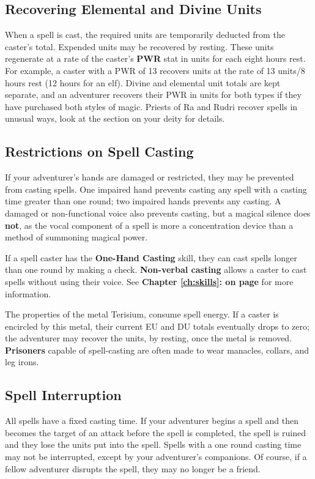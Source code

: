 \begin{multicols*}{2}
\subsection{Recovering Elemental and Divine Units}
When a spell is cast, the required units are temporarily deducted from the caster's total. Expended units may be recovered by resting. These units regenerate at a rate
of the caster's \textbf{PWR} stat in units for each eight hours rest. For example, a caster with a PWR of 13 recovers units at the rate of 13 units/8 hours rest (12 hours for an elf). Divine and elemental unit totals are kept separate, and an adventurer recovers their PWR in units for both types if they have purchased both styles of magic. Priests of Ra and Rudri recover spells in unusual ways, look at the section on your deity for details.
\subsection{Restrictions on Spell Casting}
If your adventurer's hands are damaged or restricted, they may be prevented from casting spells. One impaired hand prevents casting any spell with a casting time greater than one round; two impaired hands prevents any casting. A damaged or non-functional voice also prevents casting, but a magical silence does \textbf{not}, as the vocal component of a spell is more a concentration device than a method of summoning magical power. 

If a spell caster has the \textbf{One-Hand Casting} skill, they can cast spells longer than one round by making a check. \textbf{Non-verbal casting} allows a caster to cast spells without using their voice. See \textbf{Chapter \ref{ch:skills}:  on page \pageref{ch:skills}} for more information.

The properties of the metal Terisium, consume spell energy. If a caster is encircled by this metal, their current EU and DU totals eventually drops to zero; the adventurer may recover the units, by resting, once the metal is removed. 
\textbf{Prisoners} capable of spell-casting are often made to wear manacles, collars, and leg irons.
\subsection{Spell Interruption}
All spells have a fixed casting time. If your adventurer begins a spell and then becomes the target of an attack before the spell is completed, the spell is ruined and they lose the units put into the spell. Spells with a one round casting time may not be interrupted, except by your adventurer's companions. Of course, if a fellow adventurer disrupts the spell, they may no longer be a friend.

\end{multicols*}
